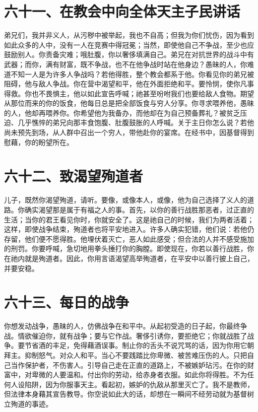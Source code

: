 \section{六十一、在教会中向全体天主子民讲话}

弟兄们，我并非义人，从污秽中被举起，我也不自高；但我为你们忧伤，因为看到如此众多的人中，没有一人在竞赛中得冠冕；当然，即使他自己不争战，至少也应鼓励别人。你责备灾难；哦肚腹，你以奢侈填满自己。弟兄在对抗世界的战斗中有武器；而你，满有财富，既不争战，也不在他争战时站在他身边？愚昧的人，你难道不知一人是为许多人争战吗？若他得胜，整个教会都系于他。你看见你的弟兄被阻碍，他与敌人争战。你在营中渴望和平，他在外面拒绝和平。要怜悯，使你凡事得救。你也不畏惧主，他以如此宣告呼喊；祂甚至吩咐我们也要给敌人食物。期望从那位而来的你的饭食，他每日总是把全部饭食与穷人分享。你寻求喂养他，愚昧的人，他却再喂养你。你希望他为我备办，而他却在为自己预备葬礼？被贫乏压迫、几乎憔悴的弟兄向那丰食饱腹、肚腹鼓胀的人呼喊。关于主日你怎么说？若他尚未预先到场，从人群中召出一个穷人，带他赴你的宴席。在经书中，因基督得到慰藉，你的盼望所在。\par


\section{六十二、致渴望殉道者}

儿子，既然你渴望殉道，请听。要像，或像本人，或像，他为自己选择了义人的道路。你确实渴望那是属于有福之人的事。首先，以你的善行战胜那恶者，过正直的生活；当你的君王看见你时，你就安全了。这是祂自己的时候，我们为两者活着；这样，即使战争结束，殉道者也将平安地进入。许多人确实犯错，他们说：若他仍存留，他们便不愿得胜。他埋伏着灭亡，恶人如此感受；但合法的人并不感受施加的刑罚。你要呼喊，急切地用拳头捶打你的胸膛。即使现在，你若以善行战胜，你在祂内就是殉道者。因此，你用言语渴望高举殉道者，在平安中以善行披上自己，并要安稳。\par


\section{六十三、每日的战争}

你想发动战争，愚昧的人，仿佛战争在和平中。从起初受造的日子起，你最终争战。情欲催迫你，就有战争；要与它作战。奢侈引诱你，要拒绝它；你就战胜了战争。要节省酒的丰足，免得藉酒误事。制止你的舌头不说咒骂的话，因为你用它朝拜主。抑制怒气。对众人和平。当心不要践踏比你卑微、被苦难压伤的人。只把自己当作保护者，不伤害人。引导自己走在正直的道路上，不被嫉妒玷污。在你的财富中，对卑微的人要温和。付出你的劳动，给赤身者衣服。如此你将得胜。不为任何人设陷阱，因为你服事天主。看起初，嫉妒的仇敌从那里灭亡了。我不是教师，但法律本身藉其宣告教导。你空说如此大的话，却想在一瞬间不经劳动就为基督树立殉道的事迹。\par

